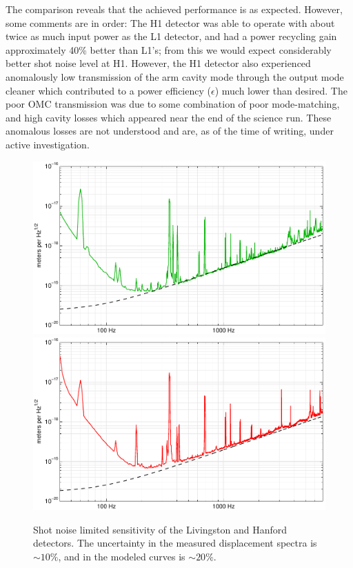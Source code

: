 The comparison reveals that the achieved performance is as expected.  However,
some comments are in order: The H1 detector was able to operate with about twice
as much input power as the L1 detector, and had a power recycling gain
approximately 40\% better than L1's; from this we would expect considerably
better shot noise level at H1.  However, the H1 detector also experienced
anomalously low transmission of the arm cavity mode through the output mode
cleaner which contributed to a power efficiency ($\epsilon$) much lower than
desired.  The poor OMC transmission was due to some combination of poor
mode-matching, and high cavity losses which appeared near the end of the science
run.  These anomalous losses are not understood and are, as of the time of
writing, under active investigation.  

\begin{figure}
\includegraphics[width=\columnwidth]{figures/L1-965543700-thesis.pdf}
\includegraphics[width=\columnwidth]{figures/H1-962268780-thesis.pdf}
\caption[Shot noise sensitivity limit (measured and
  expected)]{\label{fig:shot-noise-limited-sensitivity}Shot noise
  limited sensitivity of the Livingston and Hanford detectors.  The
  uncertainty in the measured displacement spectra is $\sim10\%$, and
  in the modeled curves is $\sim20\%$.}
\end{figure}


